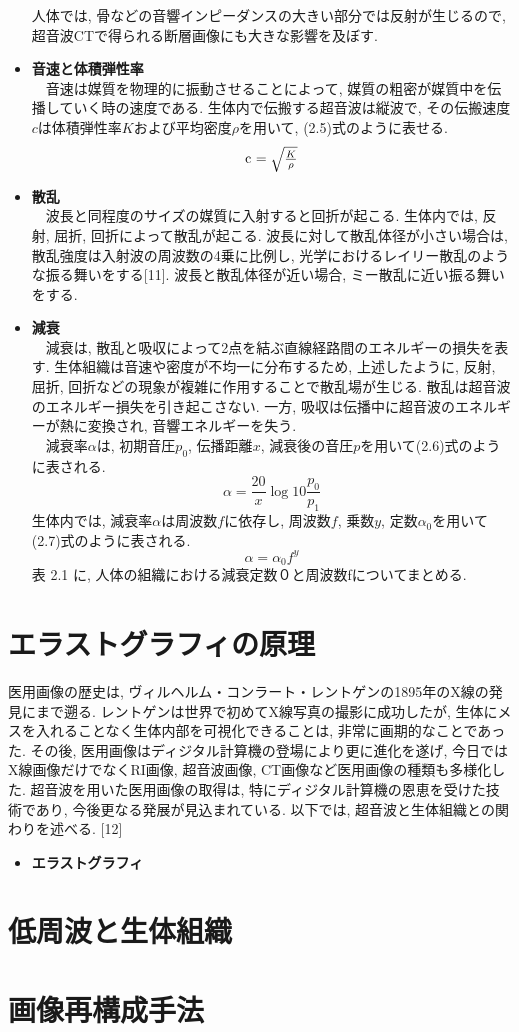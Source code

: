 \begin{itemize}
\begin{equation}
\end{equation}
人体では, 骨などの音響インピーダンスの大きい部分では反射が生じるので, 超音波CTで得られる断層画像にも大きな影響を及ぼす. 
\item{\bf 音速と体積弾性率}
\\\ \ 音速は媒質を物理的に振動させることによって, 媒質の粗密が媒質中を伝播していく時の速度である. 生体内で伝搬する超音波は縦波で, その伝搬速度$c$は体積弾性率$K$および平均密度$\rho$を用いて, (2.5)式のように表せる.
\begin{equation}
$c$\ = \sqrt{\frac{K}{\rho}}
\end{equation}
\item{\bf 散乱}
\\\ \ 波長と同程度のサイズの媒質に入射すると回折が起こる. 生体内では, 反射, 屈折, 回折によって散乱が起こる. 波長に対して散乱体径が小さい場合は, 散乱強度は入射波の周波数の4乗に比例し, 光学におけるレイリー散乱のような振る舞いをする[11]. 波長と散乱体径が近い場合, ミー散乱に近い振る舞いをする. 
\item{\bf 減衰}
\\\ \ 減衰は, 散乱と吸収によって2点を結ぶ直線経路間のエネルギーの損失を表す. 生体組織は音速や密度が不均一に分布するため, 上述したように, 反射, 屈折, 回折などの現象が複雑に作用することで散乱場が生じる. 散乱は超音波のエネルギー損失を引き起こさない. 一方, 吸収は伝播中に超音波のエネルギーが熱に変換され, 音響エネルギーを失う.
\\\ \ 減衰率$\alpha$は, 初期音圧$p_0$, 伝播距離$x$, 減衰後の音圧$p$を用いて(2.6)式のように表される.
\begin{equation}
\alpha = \frac{20}{x}  \log{10} \frac{p_0}{p_1}
\end{equation}
生体内では, 減衰率$\alpha$は周波数$f$に依存し, 周波数$f$, 乗数$y$, 定数$\alpha_0$を用いて(2.7)式のように表される.
\begin{equation}
\alpha = \alpha_0f^y
\end{equation}
表 2.1 に, 人体の組織における減衰定数０と周波数fについてまとめる.
\end{itemize}

\section{エラストグラフィの原理}
医用画像の歴史は, ヴィルヘルム・コンラート・レントゲンの1895年のX線の発見にまで遡る. レントゲンは世界で初めてX線写真の撮影に成功したが,  生体にメスを入れることなく生体内部を可視化できることは, 非常に画期的なことであった. その後, 医用画像はディジタル計算機の登場により更に進化を遂げ, 今日ではX線画像だけでなくRI画像, 超音波画像, CT画像など医用画像の種類も多様化した. 超音波を用いた医用画像の取得は, 特にディジタル計算機の恩恵を受けた技術であり, 今後更なる発展が見込まれている. 以下では, 超音波と生体組織との関わりを述べる. [12]
\begin{itemize}
\item{\bf エラストグラフィ}
\end{itemize}
\section{低周波と生体組織}
\section{画像再構成手法}



